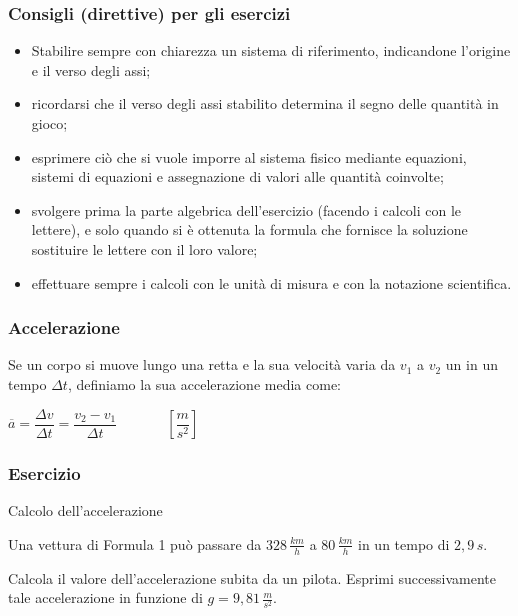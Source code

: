 \documentclass[]{beamer}
\theoremstyle{plain}
\begin{document}
\begin{frame}
  \frametitle{Consigli (direttive) per gli esercizi}
  
  \begin{itemize}
    \item Stabilire sempre con chiarezza un \alert{sistema di riferimento}, indicandone l'origine e il verso degli assi;\pause
    \item ricordarsi che il verso degli assi stabilito determina il \alert{segno} delle quantità in gioco;\pause
    \item esprimere ciò che si vuole imporre al sistema fisico mediante equazioni, sistemi di equazioni e assegnazione di valori alle quantità coinvolte;\pause
    \item svolgere \alert{prima} la parte algebrica dell'esercizio (facendo i calcoli con le lettere), e solo quando si è ottenuta la formula che fornisce la soluzione sostituire le lettere con il loro valore;\pause
    \item effettuare sempre i calcoli con le \alert{unità di misura} e con la \alert{notazione scientifica}.
  \end{itemize}
\end{frame}



\begin{frame}
\frametitle{Accelerazione}
Se un corpo si muove lungo una retta e la sua velocità varia da $ v_1 $ a $ v_2 $ un in un tempo $ \Delta t $, definiamo la sua \alert{accelerazione media} come:
\begin{center}
\colorbox{blue!30}{$ \overline{a} = \dfrac{\Delta v}{\Delta t} = \dfrac{v_2 -v_1}{\Delta t} $}~~~~~~~$ \left[ \dfrac{m}{s^2} \right] $
\end{center}
\end{frame}



\begin{frame}
\frametitle{Esercizio}
\begin{exampleblock}{Calcolo dell'accelerazione}
  \small{Una vettura di Formula 1 può passare da $ 328 \, \frac{km}{h} $ a $ 80 \, \frac{km}{h} $ in un tempo di $ 2,9 \, s $.
  
  Calcola il valore dell'accelerazione subita da un pilota. Esprimi successivamente tale accelerazione in funzione di $ g = 9,81 \, \frac{m}{s^2}$.}
\end{exampleblock}
\end{frame}
\end{document}
